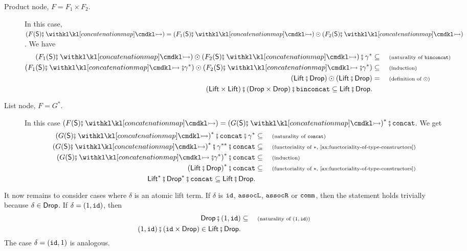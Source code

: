 \begin{description}
\begin{description}
	\item[Product node, $F = F_1 \times F_2$.] In this case, $\left( F(\mathsf{S}) \comp \concmap \right) = \left( F_1(\mathsf{S}) \comp \concmap \right) \odot \left( F_2(\mathsf{S}) \comp \concmap \right)$. We have 
	\begin{align*}
		\left( F_1(\mathsf{S}) \comp \concmap \right) \odot \left( F_2(\mathsf{S}) \comp \concmap \right) \comp \gamma^* &\subseteq \why{naturality of $\binconcatterm$} \\ 
		\left( F_1(\mathsf{S}) \comp \concmap \comp \gamma^* \right) \odot \left( F_2(\mathsf{S}) \comp \concmap \comp \gamma^* \right) &\subseteq \why{induction} \\ 
		\left( \Lift \comp \Drop \right) \odot \left( \Lift \comp \Drop \right) &= \why{definition of $\odot$} \\
		(\Lift \times \Lift) \comp (\Drop \times \Drop) \comp \binconcatterm \subseteq \Lift \comp \Drop.
	\end{align*}

	\item[List node, $F = G^*$.] In this case $\left( F(\mathsf{S}) \comp \concmap \right) = \left( G(\mathsf{S}) \comp \concmap \right)^* \comp \concatterm$. We get
	\begin{align*}
		\left( G(\mathsf{S}) \comp \concmap \right)^* \comp \concatterm \comp \gamma^* &\subseteq \why{naturality of $\concatterm$} \\ 
		\left( G(\mathsf{S}) \comp \concmap \right)^* \comp \gamma^{**} \comp \concatterm &\subseteq \why{functoriality of $*$, \cref{ax:functoriality-of-type-constructors}} \\ 
		\left( G(\mathsf{S}) \comp \concmap \comp \gamma^* \right)^* \comp \concatterm &\subseteq \why{induction} \\ 
		\left( \Lift \comp \Drop \right)^* \comp \concatterm &\subseteq \why{functoriality of $*$, \cref{ax:functoriality-of-type-constructors}} \\ 
		\Lift^* \comp \Drop^* \comp \concatterm \subseteq \Lift \comp \Drop.
	\end{align*}
\end{description}

\item[Atomic lifts, easy cases.] It now remains to consider cases where $\delta$ is an atomic lift term. If $\delta$ is $\mathtt{id}$, $\mathtt{assocL}$, $\mathtt{assocR}$ or $\mathtt{comm}$, then the statement holds trivially because $\delta \in \mathsf{Drop}$. If $\delta = (1, \mathtt{id})$, then
\begin{align*}
	\Drop \comp \unitlterm &\subseteq \why{naturality of $\unitlterm$} \\ 
	\unitlterm \comp (\idterm \times \Drop) \in \Lift \comp \Drop.
\end{align*}
The case $\delta = (\mathtt{id}, 1)$ is analogous. 


\end{description}
